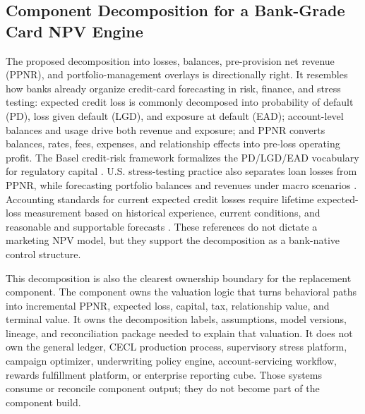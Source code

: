 \documentclass[11pt]{article}
\newcommand{\1}{\mathbf{1}}
\begin{document}
\subsection{Component Decomposition for a Bank-Grade Card NPV Engine}
\label{sec:component-decomposition}

The proposed decomposition into losses, balances, pre-provision net revenue
(PPNR), and portfolio-management overlays is directionally right. It resembles
how banks already organize credit-card forecasting in risk, finance, and stress
testing: expected credit loss is commonly decomposed into probability of default
(PD), loss given default (LGD), and exposure at default (EAD); account-level
balances and usage drive both revenue and exposure; and PPNR converts balances,
rates, fees, expenses, and relationship effects into pre-loss operating profit.
The Basel credit-risk framework formalizes the PD/LGD/EAD vocabulary for
regulatory capital \citep{bcbs2006basel}. U.S. stress-testing practice also
separates loan losses from PPNR, while forecasting portfolio balances and
revenues under macro scenarios
\citep{federalreserve2025stressmethodology,federalreserve2026stressmethodology}.
Accounting standards for current expected credit losses require lifetime
expected-loss measurement based on historical experience, current conditions,
and reasonable and supportable forecasts \citep{fasb2016asu201613}. These
references do not dictate a marketing NPV model, but they support the
decomposition as a bank-native control structure.

This decomposition is also the clearest ownership boundary for the replacement
component. The component owns the valuation logic that turns behavioral paths
into incremental PPNR, expected loss, capital, tax, relationship value, and
terminal value. It owns the decomposition labels, assumptions, model versions,
lineage, and reconciliation package needed to explain that valuation. It does
not own the general ledger, CECL production process, supervisory stress
platform, campaign optimizer, underwriting policy engine, account-servicing
workflow, rewards fulfillment platform, or enterprise reporting cube. Those
systems consume or reconcile component output; they do not become part of the
component build.
\end{document}
